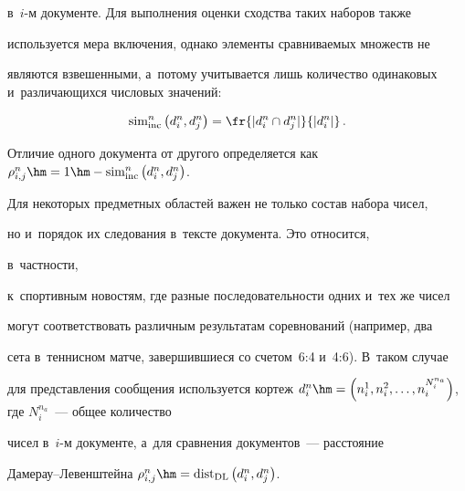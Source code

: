 в~$i$-м документе. Для выполнения оценки сходства таких наборов также

используется мера включения, однако элементы сравниваемых множеств не

являются взвешенными, а~потому учитывается лишь количество одинаковых и~различающихся числовых значений:



\vspace*{2pt}



\noindent

  $$

  \mathrm{sim}^n_{\mathrm{inc}}\left( d_i^n,d_j^n\right) = \fr{\vert d_i^n\cap d_j^n\vert} {\vert

d_i^n\vert}\,.

  $$



  \vspace*{-2pt}



  Отличие одного документа от другого определяется как $\rho_{i,j}^n\hm= 1\hm-

\mathrm{sim}^n_{\mathrm{inc}} \left( d_i^n, d_j^n\right)$.



  Для некоторых предметных областей важен не только состав набора чисел,

но и~порядок их следования в~тексте документа. Это относится,

в~частности, %



 к~спортивным новостям, где разные последовательности одних и~тех же чисел

могут соответствовать различным результатам соревнований (например, два

сета в~теннисном матче, завершившиеся со счетом~6:4 и~4:6). В~таком случае

для представления сообщения используется кортеж $d_i^n\hm= \left( n_i^1,

n_i^2, \ldots , n_i^{N_i^{n_a}}\right)$, где $N_i^{n_a}$~--- общее количество

чисел в~$i$-м документе, а~для сравнения документов~--- расстояние

Да\-ме\-рау--Ле\-вен\-штей\-на $\rho^n_{i,j}\hm= \mathrm{dist}_{\mathrm{DL}}\left( d_i^n, d_j^n\right)$.



